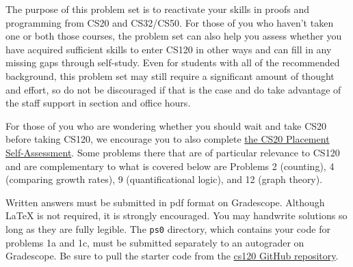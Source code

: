 \documentclass[11pt]{article}
\begin{document}

The purpose of this problem set is to reactivate your skills in proofs and programming from CS20 and CS32/CS50. For those of you who haven't taken one or both those courses, the problem set can also help you assess whether you have acquired sufficient skills to enter CS120 in other ways and can fill in any missing gaps through self-study. Even for students with all of the recommended background, this problem set may still require a significant amount of thought and effort, so do not be discouraged if that is the case and do take advantage of the staff support in section and office hours. 

For those of you who are wondering whether you should wait and take CS20 before taking CS120, we encourage you to also complete  \href{https://drive.google.com/file/d/1QIJR6sb9hfkK67PhpQaK9KQBzYwzXvsW/view}{the CS20 Placement Self-Assessment}.  Some problems there that are of particular relevance to CS120 and are complementary to what is covered below are Problems 2 (counting), 4 (comparing growth rates), 9 (quantificational logic), and 12 (graph theory). 

Written answers must be submitted in pdf format on Gradescope. Although \LaTeX{} is not required, it is strongly encouraged. You may handwrite solutions so long as they are fully legible. The \texttt{ps0} directory, which contains your code for problems 1a and 1c, must be submitted separately to an autograder on Gradescope. Be sure to pull the starter code from the \href{https://github.com/Harvard-CS-120/cs120}{cs120 GitHub repository}.

 \newcommand{\children}{\mathit{children}}
 \newcommand{\parent}{\mathit{parent}}
 
\end{document}

